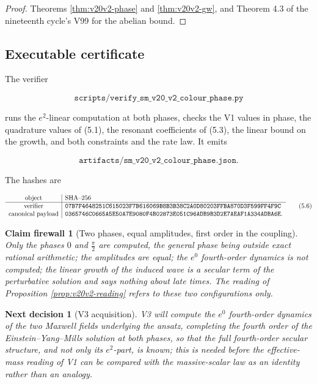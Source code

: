 \documentclass[11pt]{article}
\newtheorem{firewall}[theorem]{Claim firewall}
\newtheorem{decision}[theorem]{Next decision}
\theoremstyle{remark}
\begin{document}
\begin{proof}
Theorems \ref{thm:v20v2-phase} and \ref{thm:v20v2-gw}, and
Theorem 4.3 of the nineteenth cycle's V99 for the abelian bound.
\end{proof}

\subsection{Executable certificate}

The verifier

\[
 \texttt{scripts/verify\_sm\_v20\_v2\_colour\_phase.py}               \tag{5.4}
\]

runs the \(e^2\)-linear computation at both phases, checks the V1
values in phase, the quadrature values of (5.1), the resonant
coefficients of (5.3), the linear bound on the growth, and both
constraints and the rate law.  It emits

\[
 \texttt{artifacts/sm\_v20\_v2\_colour\_phase.json}.                  \tag{5.5}
\]

The hashes are

\[
\begin{array}{c|l}
\hbox{object}&\hbox{SHA--256}\\ \hline
\hbox{verifier}&
\texttt{07B7F4648251C615023F7B616069B8B3B38C2A0D80203FFBA870D3F599FF4F9C}\\
\hbox{canonical payload}&
\texttt{0365746C0665A5E50A7E9080F4B02873E051C96ADB9B3D2E7AEAF1A334ADBA6E}.
\end{array}                                                     \tag{5.6}
\]

\begin{firewall}[Two phases, equal amplitudes, first order in the coupling]
\label{fire:v20v2}
Only the phases \(0\) and \(\tfrac\pi2\) are computed, the general phase
being outside exact rational arithmetic; the amplitudes are equal;
the \(e^0\) fourth-order dynamics is not computed; the linear growth of
the induced wave is a secular term of the perturbative solution and
says nothing about late times.  The reading of Proposition
\ref{prop:v20v2-reading} refers to these two configurations only.
\end{firewall}

\begin{decision}[V3 acquisition]
\label{dec:v20v2-next}
V3 will compute the \(e^0\) fourth-order dynamics of the two Maxwell
fields underlying the ansatz, completing the fourth order of the
Einstein--Yang--Mills solution at both phases, so that the full
fourth-order secular structure, and not only its \(e^2\)-part, is
known; this is needed before the effective-mass reading of V1 can be
compared with the massive-scalar law as an identity rather than an
analogy.
\end{decision}
\end{document}
